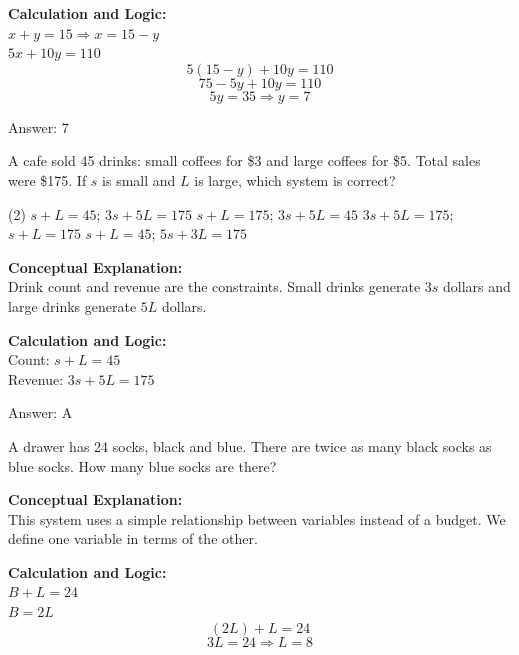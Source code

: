 \documentclass[11pt,paper=a4,answers]{exam}
\begin{document}
\begin{questions}
\begin{solution}
\vspace{10pt}
\textbf{Calculation and Logic:} \\
$x + y = 15 \Rightarrow x = 15 - y$ \\
$5x + 10y = 110$ \\
\[5(15 - y) + 10y = 110\]
\[75 - 5y + 10y = 110\]
\[5y = 35 \Rightarrow y = 7\]

\vspace{15pt}
Answer: \colorbox{yellow!100}{7}
\end{solution}

\question
A cafe sold 45 drinks: small coffees for \$3 and large coffees for \$5. Total sales were \$175. If $s$ is small and $L$ is large, which system is correct?
\begin{tasks}(2)
    \task $s + L = 45$; $3s + 5L = 175$
    \task $s + L = 175$; $3s + 5L = 45$
    \task $3s + 5L = 175$; $s + L = 175$
    \task $s + L = 45$; $5s + 3L = 175$
\end{tasks}

\begin{solution}
\textbf{Conceptual Explanation:} \\
Drink count and revenue are the constraints. Small drinks generate $3s$ dollars and large drinks generate $5L$ dollars.

\vspace{10pt}
\textbf{Calculation and Logic:} \\
Count: $s + L = 45$ \\
Revenue: $3s + 5L = 175$

\vspace{15pt}
Answer: \colorbox{yellow!100}{A}
\end{solution}

\question
A drawer has 24 socks, black and blue. There are twice as many black socks as blue socks. How many blue socks are there?

\begin{solution}
\textbf{Conceptual Explanation:} \\
This system uses a simple relationship between variables instead of a budget. We define one variable in terms of the other.

\vspace{10pt}
\textbf{Calculation and Logic:} \\
$B + L = 24$ \\
$B = 2L$ \\
\[(2L) + L = 24\]
\[3L = 24 \Rightarrow L = 8\]


\end{solution}
\end{questions}
\end{document}
